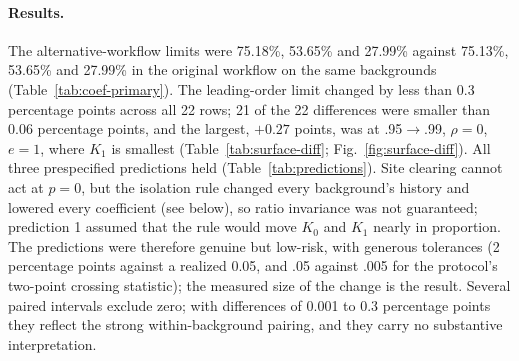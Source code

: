 \paragraph{Results.} The alternative-workflow limits were 75.18\%, 53.65\% and
27.99\% against 75.13\%, 53.65\% and 27.99\% in the original workflow on the same
backgrounds (Table~\ref{tab:coef-primary}). The leading-order limit changed by
less than 0.3 percentage points across all 22 rows; 21 of the 22 differences
were smaller than 0.06 percentage points, and the largest, $+0.27$ points, was
at .95$\to$.99, $\rho=0$, $e=1$, where $K_1$ is smallest
(Table~\ref{tab:surface-diff}; Fig.~\ref{fig:surface-diff}). All three
prespecified predictions held (Table~\ref{tab:predictions}). Site clearing
cannot act at $p=0$, but the isolation rule changed every background's history
and lowered every coefficient (see below), so ratio invariance was not
guaranteed; prediction 1 assumed that the rule would move $K_0$ and $K_1$
nearly in proportion. The predictions were therefore genuine but low-risk, with
generous tolerances (2 percentage points against a realized 0.05, and .05
against .005 for the protocol's two-point crossing statistic); the measured size of the change is the result. Several paired intervals exclude zero; with differences of 0.001
to 0.3 percentage points they reflect the strong within-background pairing, and
they carry no substantive interpretation.


